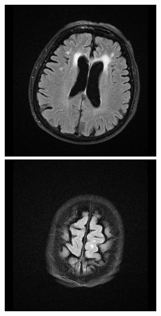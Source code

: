 \documentclass[conference]{IEEEtran}
\begin{document}
\begin{figure}[h!]
\includegraphics[scale = 0.2]{origin_14.png}
\includegraphics[scale = 0.2]{origin_21.png}


\end{figure}
\end{document}
